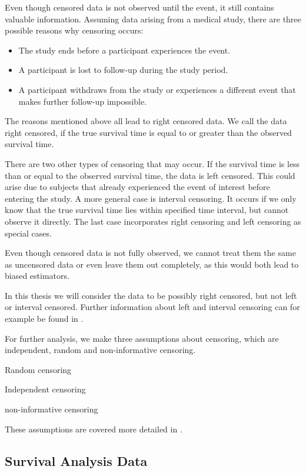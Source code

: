 \documentclass[12pt, a4paper]{article}
\theoremstyle{definition}
\theoremstyle{plain}
\numberwithin{equation}{section}
\numberwithin{figure}{section}
\numberwithin{table}{section}
\begin{document}
	Even though censored data is not observed until the event, it still contains valuable information.
	Assuming data arising from a medical study, there are three possible reasons why censoring occurs:
	\begin{itemize}
		\item The study ends before a participant experiences the event.
		\item A participant is lost to follow-up during the study period.
		\item A participant withdraws from the study or experiences a different event that makes further follow-up impossible.
	\end{itemize}

	The reasons mentioned above all lead to right censored data.
	We call the data right censored, if the true survival time is equal to or greater than the observed survival time.
	
	There are two other types of censoring that may occur.
	If the survival time is less than or equal to the observed survival time, the data is left censored.
	This could arise due to subjects that already experienced the event of interest before entering the study.
	A more general case is interval censoring. It occurs if we only know that the true survival time lies within specified time interval, but cannot observe it directly.
	The last case incorporates right censoring and left censoring as special cases.
	
	Even though censored data is not fully observed, we cannot treat them the same as uncensored data or even leave them out completely, as this would both lead to biased estimators.
	
		
	In this thesis we will consider the data to be possibly right censored, but not left or interval censored.
	Further information about left and interval censoring can for example be found in \citet*{bookfailuretime}.
	
	For further analysis, we make three assumptions about censoring, which are independent, random and non-informative censoring.
	
	Random censoring
	
	Independent censoring
	
	non-informative censoring
	
	These assumptions are covered more detailed in \citet*{bookfailuretime}.
	
	
	\subsection{Survival Analysis Data} \label{sabasics}
	
\end{document}
